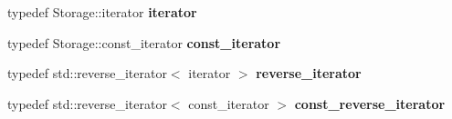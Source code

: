\begin{DoxyCompactItemize}
\item 
\hypertarget{classflex__string_a8cd7b30a00d934ccd6661afdcdd0c67b}{}typedef Storage\+::iterator {\bfseries iterator}\label{classflex__string_a8cd7b30a00d934ccd6661afdcdd0c67b}

\item 
\hypertarget{classflex__string_a22f3fb6c89f0f3f4c9ee4dd7cf816196}{}typedef Storage\+::const\+\_\+iterator {\bfseries const\+\_\+iterator}\label{classflex__string_a22f3fb6c89f0f3f4c9ee4dd7cf816196}

\item 
\hypertarget{classflex__string_a8396716ab94a6b57f3347055a94cf0e4}{}typedef std\+::reverse\+\_\+iterator$<$ iterator $>$ {\bfseries reverse\+\_\+iterator}\label{classflex__string_a8396716ab94a6b57f3347055a94cf0e4}

\item 
\hypertarget{classflex__string_ab86c55410af53cb8c84153e992db1006}{}typedef std\+::reverse\+\_\+iterator$<$ const\+\_\+iterator $>$ {\bfseries const\+\_\+reverse\+\_\+iterator}\label{classflex__string_ab86c55410af53cb8c84153e992db1006}

\end{DoxyCompactItemize}

